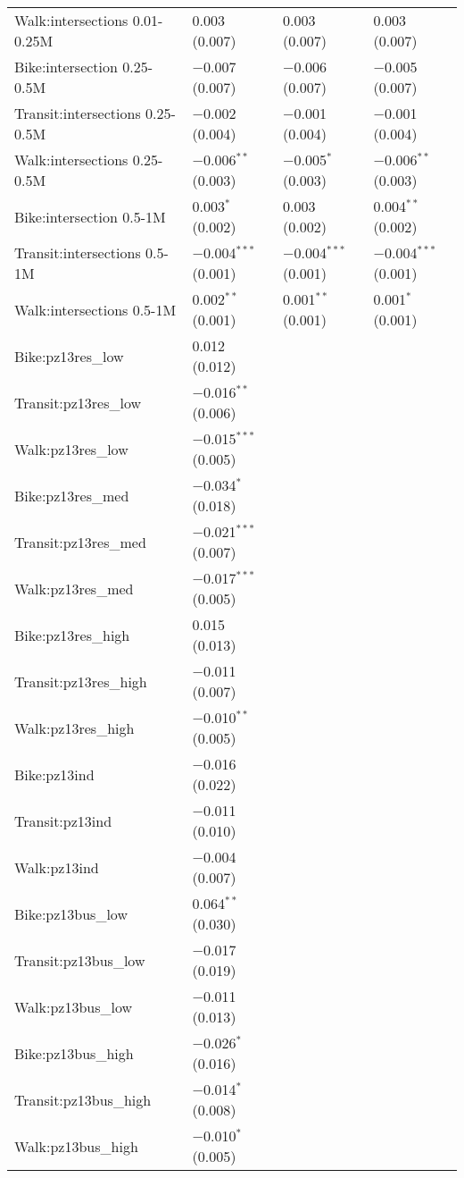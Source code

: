 \begin{longtabu}{llll}
  Walk:intersections 0.01-0.25M & 0.003 (0.007) & 0.003 (0.007) & 0.003 (0.007) \\ 
  Bike:intersection 0.25-0.5M & $-$0.007 (0.007) & $-$0.006 (0.007) & $-$0.005 (0.007) \\ 
  Transit:intersections 0.25-0.5M & $-$0.002 (0.004) & $-$0.001 (0.004) & $-$0.001 (0.004) \\ 
  Walk:intersections 0.25-0.5M & $-$0.006$^{**}$ (0.003) & $-$0.005$^{*}$ (0.003) & $-$0.006$^{**}$ (0.003) \\ 
  Bike:intersection 0.5-1M & 0.003$^{*}$ (0.002) & 0.003 (0.002) & 0.004$^{**}$ (0.002) \\ 
  Transit:intersections 0.5-1M & $-$0.004$^{***}$ (0.001) & $-$0.004$^{***}$ (0.001) & $-$0.004$^{***}$ (0.001) \\ 
  Walk:intersections 0.5-1M & 0.002$^{**}$ (0.001) & 0.001$^{**}$ (0.001) & 0.001$^{*}$ (0.001) \\ 
  Bike:pz13res\_low & 0.012 (0.012) &  &  \\ 
  Transit:pz13res\_low & $-$0.016$^{**}$ (0.006) &  &  \\ 
  Walk:pz13res\_low & $-$0.015$^{***}$ (0.005) &  &  \\ 
  Bike:pz13res\_med & $-$0.034$^{*}$ (0.018) &  &  \\ 
  Transit:pz13res\_med & $-$0.021$^{***}$ (0.007) &  &  \\ 
  Walk:pz13res\_med & $-$0.017$^{***}$ (0.005) &  &  \\ 
  Bike:pz13res\_high & 0.015 (0.013) &  &  \\ 
  Transit:pz13res\_high & $-$0.011 (0.007) &  &  \\ 
  Walk:pz13res\_high & $-$0.010$^{**}$ (0.005) &  &  \\ 
  Bike:pz13ind & $-$0.016 (0.022) &  &  \\ 
  Transit:pz13ind & $-$0.011 (0.010) &  &  \\ 
  Walk:pz13ind & $-$0.004 (0.007) &  &  \\ 
  Bike:pz13bus\_low & 0.064$^{**}$ (0.030) &  &  \\ 
  Transit:pz13bus\_low & $-$0.017 (0.019) &  &  \\ 
  Walk:pz13bus\_low & $-$0.011 (0.013) &  &  \\ 
  Bike:pz13bus\_high & $-$0.026$^{*}$ (0.016) &  &  \\ 
  Transit:pz13bus\_high & $-$0.014$^{*}$ (0.008) &  &  \\ 
  Walk:pz13bus\_high & $-$0.010$^{*}$ (0.005) &  &  \\ 

\end{longtabu}
